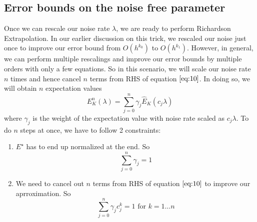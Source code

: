 \documentclass{article}
\begin{document}
\subsection{Error bounds on the noise free parameter}
Once we can rescale our noise rate \(\lambda\), we are ready to perform
Richardson Extrapolation. In our earlier discussion on this trick, we rescaled
our noise just once to improve our error bound from \(O(h^{k_0})\) to \(O(h^{k_1})\).
However, in general, we can perform multiple rescalings and improve our
error bounds by multiple orders with only a few equations. So in this scenario,
we will scale our noise rate \(n\) times and hence cancel \(n\) terms from
RHS of equation \(\ref{eq:10}\). In doing so, we will obtain \(n\)  expectation
values
\begin{equation}
  E^n_{K}(\lambda) = \sum^n_{j=0} \gamma_j \hat{E}_K(c_j \lambda)
\end{equation}
where \(\gamma_j\) is the weight of the expectation value with noise rate
scaled as \(c_j \lambda\). To do \(n\) steps at once, we have to follow 2
constraints:
\begin{enumerate}
  \item \(E^\star\) has to end up normalized at the end. So
  \[\sum_{j=0}^n \gamma_j= 1\]
  \item We need to cancel out \(n\) terms from RHS of equation \(\ref{eq:10}\)
   to improve our aprroximation. So
   \[\sum_{j=0}^n \gamma_j c^k_j= 1 \text{  for  } k = 1 \ldots n\]
\end{enumerate}
\end{document}
